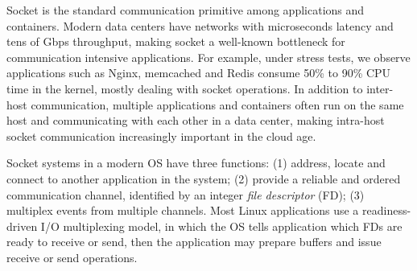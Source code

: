 

Socket is the standard communication primitive among applications and containers.
Modern data centers have networks with microseconds latency and tens of Gbps throughput, making socket a well-known bottleneck for communication intensive applications.
For example, under stress tests, we observe applications such as Nginx, memcached and Redis consume 50\% to 90\% CPU time in the kernel, mostly dealing with socket operations.
In addition to inter-host communication, multiple applications and containers often run on the same host and communicating with each other in a data center, making intra-host socket communication increasingly important in the cloud age.

Socket systems in a modern OS have three functions:
(1) address, locate and connect to another application in the system; %
(2) provide a reliable and ordered communication channel, identified by an integer \emph{file descriptor} (FD);
(3) multiplex events from multiple channels.
Most Linux applications use a readiness-driven I/O multiplexing model, in which the OS tells application which FDs are ready to receive or send, then the application may prepare buffers and issue receive or send operations.




